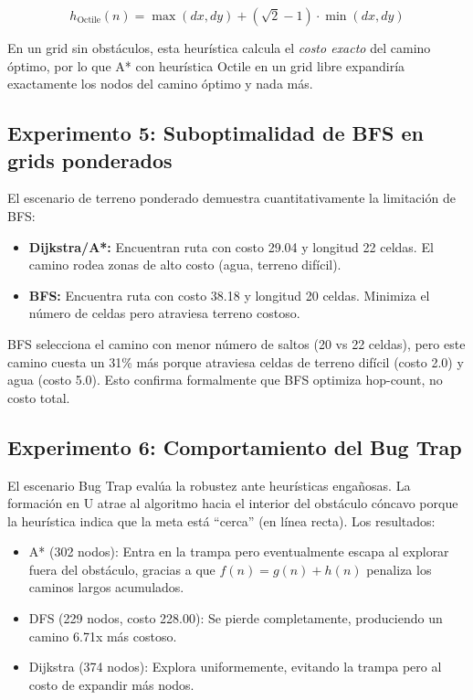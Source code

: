 \begin{equation}
    h_{\text{Octile}}(n) = \max(dx, dy) + (\sqrt{2} - 1) \cdot \min(dx, dy)
\end{equation}

En un grid sin obstáculos, esta heurística calcula el \textit{costo exacto} del camino óptimo, por lo que A* con heurística Octile en un grid libre expandiría exactamente los nodos del camino óptimo y nada más.

\subsection{Experimento 5: Suboptimalidad de BFS en grids ponderados}

El escenario de terreno ponderado demuestra cuantitativamente la limitación de BFS:

\begin{itemize}
    \item \textbf{Dijkstra/A*:} Encuentran ruta con costo 29.04 y longitud 22 celdas. El camino rodea zonas de alto costo (agua, terreno difícil).
    \item \textbf{BFS:} Encuentra ruta con costo 38.18 y longitud 20 celdas. Minimiza el número de celdas pero atraviesa terreno costoso.
\end{itemize}

BFS selecciona el camino con menor número de saltos (20 vs 22 celdas), pero este camino cuesta un 31\% más porque atraviesa celdas de terreno difícil (costo 2.0) y agua (costo 5.0). Esto confirma formalmente que BFS optimiza hop-count, no costo total.

\subsection{Experimento 6: Comportamiento del Bug Trap}

El escenario Bug Trap evalúa la robustez ante heurísticas engañosas. La formación en U atrae al algoritmo hacia el interior del obstáculo cóncavo porque la heurística indica que la meta está ``cerca'' (en línea recta). Los resultados:

\begin{itemize}
    \item A* (302 nodos): Entra en la trampa pero eventualmente escapa al explorar fuera del obstáculo, gracias a que $f(n) = g(n) + h(n)$ penaliza los caminos largos acumulados.
    \item DFS (229 nodos, costo 228.00): Se pierde completamente, produciendo un camino 6.71x más costoso.
    \item Dijkstra (374 nodos): Explora uniformemente, evitando la trampa pero al costo de expandir más nodos.
\end{itemize}

